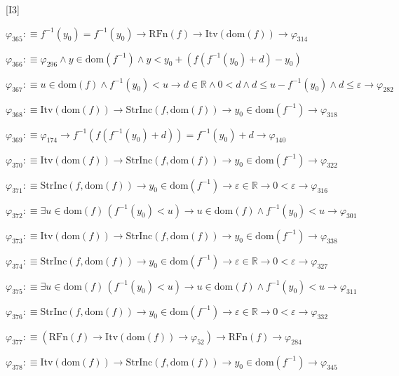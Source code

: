 \begin{fullproof}{[I3]}
\begin{abbrevlist}
\item $\varphi_{365} :\equiv f^{-1}(y_{0}) = f^{-1}(y_{0}) \to \mathrm{RFn}(f) \to \mathrm{Itv}(\mathrm{dom}(f)) \to \varphi_{314}$
\item $\varphi_{366} :\equiv \varphi_{296} \land y \in \mathrm{dom}(f^{-1}) \land y < y_{0} + (f(f^{-1}(y_{0}) + d) - y_{0})$
\item $\varphi_{367} :\equiv u \in \mathrm{dom}(f) \land f^{-1}(y_{0}) < u \to d \in \mathbb{R} \land 0 < d \land d \leq u - f^{-1}(y_{0}) \land d \leq \varepsilon \to \varphi_{282}$
\item $\varphi_{368} :\equiv \mathrm{Itv}(\mathrm{dom}(f)) \to \mathrm{StrInc}(f,\mathrm{dom}(f)) \to y_{0} \in \mathrm{dom}(f^{-1}) \to \varphi_{318}$
\item $\varphi_{369} :\equiv \varphi_{174} \to f^{-1}(f(f^{-1}(y_{0}) + d)) = f^{-1}(y_{0}) + d \to \varphi_{140}$
\item $\varphi_{370} :\equiv \mathrm{Itv}(\mathrm{dom}(f)) \to \mathrm{StrInc}(f,\mathrm{dom}(f)) \to y_{0} \in \mathrm{dom}(f^{-1}) \to \varphi_{322}$
\item $\varphi_{371} :\equiv \mathrm{StrInc}(f,\mathrm{dom}(f)) \to y_{0} \in \mathrm{dom}(f^{-1}) \to \varepsilon \in \mathbb{R} \to 0 < \varepsilon \to \varphi_{316}$
\item $\varphi_{372} :\equiv \exists u \in \mathrm{dom}(f)\,(f^{-1}(y_{0}) < u) \to u \in \mathrm{dom}(f) \land f^{-1}(y_{0}) < u \to \varphi_{301}$
\item $\varphi_{373} :\equiv \mathrm{Itv}(\mathrm{dom}(f)) \to \mathrm{StrInc}(f,\mathrm{dom}(f)) \to y_{0} \in \mathrm{dom}(f^{-1}) \to \varphi_{338}$
\item $\varphi_{374} :\equiv \mathrm{StrInc}(f,\mathrm{dom}(f)) \to y_{0} \in \mathrm{dom}(f^{-1}) \to \varepsilon \in \mathbb{R} \to 0 < \varepsilon \to \varphi_{327}$
\item $\varphi_{375} :\equiv \exists u \in \mathrm{dom}(f)\,(f^{-1}(y_{0}) < u) \to u \in \mathrm{dom}(f) \land f^{-1}(y_{0}) < u \to \varphi_{311}$
\item $\varphi_{376} :\equiv \mathrm{StrInc}(f,\mathrm{dom}(f)) \to y_{0} \in \mathrm{dom}(f^{-1}) \to \varepsilon \in \mathbb{R} \to 0 < \varepsilon \to \varphi_{332}$
\item $\varphi_{377} :\equiv (\mathrm{RFn}(f) \to \mathrm{Itv}(\mathrm{dom}(f)) \to \varphi_{52}) \to \mathrm{RFn}(f) \to \varphi_{284}$
\item $\varphi_{378} :\equiv \mathrm{Itv}(\mathrm{dom}(f)) \to \mathrm{StrInc}(f,\mathrm{dom}(f)) \to y_{0} \in \mathrm{dom}(f^{-1}) \to \varphi_{345}$

\end{abbrevlist}
\end{fullproof}
